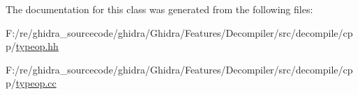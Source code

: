 The documentation for this class was generated from the following files\+:\begin{DoxyCompactItemize}
\item 
F\+:/re/ghidra\+\_\+sourcecode/ghidra/\+Ghidra/\+Features/\+Decompiler/src/decompile/cpp/\mbox{\hyperlink{typeop_8hh}{typeop.\+hh}}\item 
F\+:/re/ghidra\+\_\+sourcecode/ghidra/\+Ghidra/\+Features/\+Decompiler/src/decompile/cpp/\mbox{\hyperlink{typeop_8cc}{typeop.\+cc}}\end{DoxyCompactItemize}
